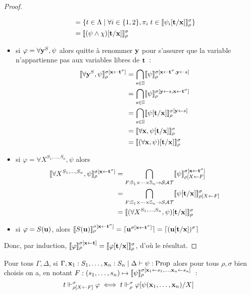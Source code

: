 \documentclass{article}
\begin{document}
\begin{proof}
\begin{itemize}
\begin{align*}
      &= \{t\in\Lambda\mid\forall i \in \{1,2\}, \pi_i\;t\in\llbracket \psi_i[\mathbf{t}/\mathbf{x}] \rrbracket_\rho^\sigma\}\\
      &= \llbracket (\psi\land\chi)[\mathbf{t}/\mathbf{x}] \rrbracket_\rho^\sigma
    \end{align*}
  \item si $\varphi = \forall \mathbf{y}^S, \psi$ alors quitte à renommer $\mathbf{y}$ pour s'assurer que la variable n'appartienne pas aux variables libres de $\mathbf{t}$~:
    \begin{align*}
      \llbracket \forall \mathbf{y}^S,\psi \rrbracket_\rho^{\sigma[\mathbf{x}\leftarrow\mathbf{t}^\sigma]} &= \bigcap_{s\in \mathbb{S}}\llbracket \psi \rrbracket_\rho^{\sigma[\mathbf{x}\leftarrow\mathbf{t}^\sigma,\mathbf{y}\leftarrow s]}\\
      &= \bigcap_{s\in\mathbb{S}}\llbracket \psi \rrbracket_\rho^{\sigma[\mathbf{y}\leftarrow s, \mathbf{x}\leftarrow \mathbf{t}^\sigma]}\\
      &= \bigcap_{s\in\mathbb{S}}\llbracket \psi[\mathbf{t}/\mathbf{x}] \rrbracket_\rho^{\sigma[\mathbf{y}\leftarrow s]}\\
      &= \llbracket \forall \mathbf{x}, \psi[\mathbf{t}/\mathbf{x}] \rrbracket_\rho^\sigma\\
      &= \llbracket (\forall \mathbf{x}, \psi)[\mathbf{t}/\mathbf{x}] \rrbracket_\rho^\sigma
    \end{align*}
  \item si $\varphi = \forall X^{S_1,\ldots,S_n}, \psi$ alors
    \begin{align*}
      \llbracket \forall X^{S_1,\ldots,S_n}, \psi \rrbracket_\rho^{\sigma[\mathbf{x}\leftarrow \mathbf{t}^\sigma]} &= \bigcap_{F : \mathbb{S}_1\times\cdots\times \mathbb{S}_n\to \mathcal {SAT}}\llbracket \psi \rrbracket_{\rho[X\leftarrow F]}^{\sigma[\mathbf{x}\leftarrow \mathbf{t}^\sigma]}\\
      &= \bigcap_{F : \mathbb{S}_1\times\cdots\times \mathbb{S}_n \to \mathcal {SAT}}\llbracket \psi[\mathbf{t}/\mathbf{x}] \rrbracket_{\rho[X\leftarrow F]}^\sigma\\
      &= \llbracket (\forall X^{S_1,\ldots,S_n}, \psi)[\mathbf{t}/\mathbf{x}] \rrbracket_\rho^\sigma
    \end{align*}
  \item si $\varphi = S(\mathbf{u})$, alors $\llbracket S(\mathbf{u}) \rrbracket_\rho^{\sigma[\mathbf{x}\leftarrow \mathbf{t}^\sigma]} = \lceil \mathbf{u}^{\sigma[\mathbf{x}\leftarrow\mathbf{t}^\sigma]} \rceil = \lceil (\mathbf{u}[\mathbf{t}/\mathbf{x}])^\sigma \rceil$
  \end{itemize}
  Donc, par induction, $\llbracket \varphi \rrbracket_\rho^{\sigma[\mathbf{x}\leftarrow\mathbf{t}]} = \llbracket \varphi[\mathbf{t}/\mathbf{x}] \rrbracket_\rho^\sigma$, d'où le résultat.
\end{proof}

\begin{lem}
  Pour tous $\Gamma,\Delta$, si $\Gamma,\mathbf{x}_1 : S_1,\ldots,\mathbf{x}_n : S_n\mid\Delta\vdash \psi : \mathrm{Prop}$ alors pour tous $\rho,\sigma$ bien choisis on a, en notant $F : (s_1,\ldots,s_n) \mapsto \llbracket \psi \rrbracket_\rho^{\sigma[\mathbf{x}_1\leftarrow s_1,\ldots,\mathbf{x}_n\leftarrow s_n]}$~:
  \[t\Vdash_{\rho[X\leftarrow F]}^\sigma \varphi \iff t\Vdash_\rho^\sigma \varphi[\psi(\mathbf{x}_1,\ldots,\mathbf{x}_n)/X]\]
\end{lem}
\end{document}
